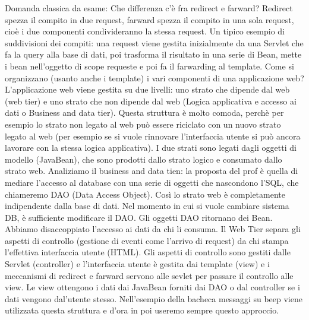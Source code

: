 Domanda classica da esame: Che differenza c'è fra redirect e farward? Redirect spezza il compito in due request, farward spezza il compito in una sola request, cioè i due componenti condivideranno la stessa request.\newline
Un tipico esempio di suddivisioni dei compiti: una request viene gestita inizialmente da una Servlet che fa la query alla base di dati, poi trasforma il risultato in una serie di Bean, mette i bean nell'oggetto di scope requeste e poi fa il farwarding al template. \newline
\newline
Come si organizzano (usanto anche i template) i vari componenti di una applicazione web?\newline
L'applicazione web viene gestita su due livelli: uno strato che dipende dal web (web tier) e uno strato che non dipende dal web (Logica applicativa e accesso ai dati o Business and data tier). \newline
Questa struttura è molto comoda, perchè per esempio lo strato non legato al web può essere riciclato con un nuovo strato legato al web (per esempio se si vuole rinnovare l'interfaccia utente si può ancora lavorare con la stessa logica applicativa).\newline
I due strati sono legati dagli oggetti di modello (JavaBean), che sono prodotti dallo strato logico e consumato dallo strato web.\newline
Analiziamo il business and data tien: la proposta del prof è quella di mediare l'accesso al database con una serie di oggetti che nascondono l'SQL, che chiameremo DAO (Data Access Object). Così lo strato web è completamente indipendente dalla base di dati. Nel momento in cui si vuole cambiare sistema DB, è sufficiente modificare il DAO. Gli oggetti DAO ritornano dei Bean. Abbiamo disaccoppiato l'accesso ai dati da chi li consuma.\newline
Il Web Tier separa gli aspetti di controllo (gestione di eventi come l'arrivo di request) da chi stampa l'effettiva interfaccia utente (HTML). Gli aspetti di controllo sono gestiti dalle Servlet (controller) e l'interfaccia utente è gestita dai template (view) e i meccanismi di redirect e farward servono alle sevlet per passare il controllo alle view. Le view ottengono i dati dai JavaBean forniti dai DAO o dal controller se i dati vengono dal'utente stesso.\newline
\newline
Nell'esempio della bacheca messaggi su beep viene utilizzata questa struttura e d'ora in poi useremo sempre questo approccio.